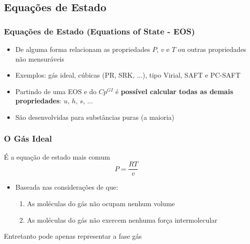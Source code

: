 \documentclass[aspectratio=169]{beamer}
\begin{document}
\subsection{Equações de Estado}

\begin{frame}
	\frametitle{Equações de Estado (Equations of State - EOS)}
	\begin{itemize}
		\item De alguma forma relacionam as propriedades $P$, $v$ e $T$ ou
		outras propriedades não mensuráveis
		\item Exemplos: gás ideal, cúbicas (PR, SRK, ...), tipo Virial, SAFT e
		PC-SAFT
		\pause
		\item Partindo de uma EOS e do $Cp^{GI}$ é \textbf{possível calcular todas
		as demais propriedades}: $u$, $h$, $s$, ...
		\item São desenvolvidas para substâncias puras (a maioria)
	\end{itemize}
\end{frame}

\begin{frame}
	\frametitle{O Gás Ideal}
	É a equação de estado mais comum
	\begin{equation*}
	P=\frac{RT}{v}
	\end{equation*}
	\begin{itemize}
	  \item Baseada nas considerações de que:
	  \begin{enumerate}
	    \item As moléculas do gás não ocupam nenhum volume
	    \item As moléculas do gás não exercem nenhuma força
		intermolecular
	  \end{enumerate}
	\end{itemize}
	Entretanto pode apenas representar a fase gás
\end{frame}
\end{document}
